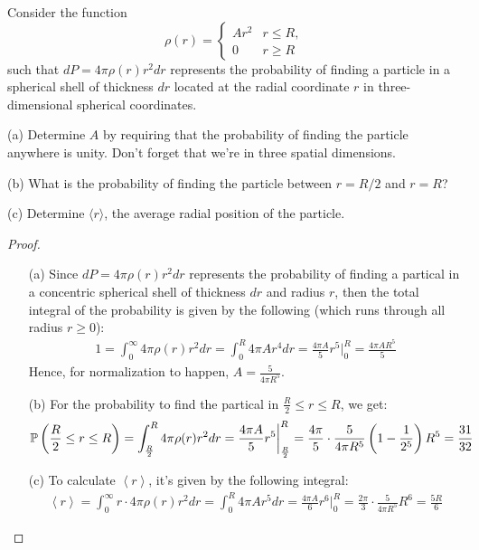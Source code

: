 \documentclass{article}
\begin{document}
\newpage

\begin{ques}\label{q3}
Consider the function
\[
\rho(r) =
\begin{cases}
Ar^2 & r \leq R,\\
0 & r \geq R
\end{cases}
\]
such that $dP = 4\pi \rho(r) r^2 dr$ represents the probability of finding a particle in a spherical shell of thickness $dr$ located at the radial coordinate $r$ in three-dimensional spherical
coordinates.

(a) Determine $A$ by requiring that the probability of finding the particle anywhere is
unity. Don’t forget that we’re in three spatial dimensions.

(b) What is the probability of finding the particle between $r = R/2$ and $r = R$?

(c) Determine $\langle r\rangle$, the average radial position of the particle.
\end{ques}
\begin{proof}

    \hfil

    \begin{itemize}
        \item[(a)] Since $dP=4\pi \rho(r)r^2 dr$ represents the probability of finding a partical in a concentric spherical shell of thickness $dr$ and radius $r$, then the total integral of the probability is given by the following (which runs through all radius $r\geq 0$):
        \begin{align}
            1 = \int_{0}^{\infty}4\pi\rho(r)r^2 dr = \int_{0}^{R}4\pi A r^4dr = \frac{4\pi A}{5}r^5\bigg|_{0}^{R} = \frac{4\pi AR^5}{5}
        \end{align}
        Hence, for normalization to happen, $A = \frac{5}{4\pi R^5}$.
        \item[(b)] For the probability to find the partical in $\frac{R}{2}\leq r\leq R$, we get:
        \begin{align}
            \mathbb{P}\left(\frac{R}{2}\leq r\leq R\right)=\int_{\frac{R}{2}}^{R}4\pi \rho(r)r^2dr = \frac{4\pi A}{5}r^5\bigg|_{\frac{R}{2}}^{R}=\frac{4\pi }{5}\cdot\frac{5}{4\pi R^5}\left(1-\frac{1}{2^5}\right)R^5 = \frac{31}{32}
        \end{align}
        \item[(c)] To calculate $\left<r\right>$, it's given by the following integral:
        \begin{align}
            \left<r\right>=\int_{0}^{\infty}r \cdot 4\pi \rho(r)r^2 dr = \int_{0}^{R}4\pi A r^5 dr = \frac{4\pi A}{6}r^6\bigg|_{0}^{R} = \frac{2\pi}{3}\cdot \frac{5}{4\pi R^5}R^6=\frac{5R}{6}
        \end{align}
    \end{itemize}
\end{proof}
\newpage
\end{document}
